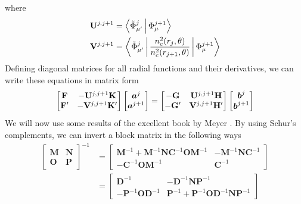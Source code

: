 where
	\begin{subequations} 
	\begin{align}
    	\mathbf{U}^{j,j+1}	&= \Braket{\tilde{\Phi}_{\mu'}^j|\Phi_\mu^{j+1}}	\\
    	\mathbf{V}^{j,j+1} &= \Braket{\tilde{\Phi}_{\mu'}^j|\frac{n^2_c(r_j,\theta)}{n^2_c(r_{j+1},\theta)}|\Phi_\mu^{j+1}}
  	\end{align}
  	\end{subequations}
Defining diagonal matrices for all radial functions
and their derivatives, we can write these equations in matrix
form 
  \begin{equation}
    \label{eq:Smatrix.boundaryCond}
    \begin{bmatrix}
      \mathbf{F} 	& -\mathbf{U}^{j,j+1}\mathbf{K}	\\
      \mathbf{F}'	& -\mathbf{V}^{j,j+1}\mathbf{K}'
    \end{bmatrix}
    \begin{bmatrix}
      \boldsymbol{a}^j	\\	\boldsymbol{a}^{j+1}
    \end{bmatrix}
     = 
     \begin{bmatrix}
      -\mathbf{G}	& \mathbf{U}^{j,j+1}\mathbf{H}	\\
      -\mathbf{G}'	& \mathbf{V}^{j,j+1}\mathbf{H}'
     \end{bmatrix}
         \begin{bmatrix}
      \boldsymbol{b}^j	\\	\boldsymbol{b}^{j+1}
    \end{bmatrix}
  \end{equation}
We will now use some results of the excellent book by Meyer \cite{MEY2001}.
By using Schur's complements, we can invert a block matrix in the following
ways
  \begin{align}
    \begin{bmatrix} \mathbf{M} & \mathbf{N} \\ \mathbf{O} & \mathbf{P} \end{bmatrix}^{-1}
     &= 
    \begin{bmatrix}
     \mathbf{M}^{-1}+\mathbf{M}^{-1}\mathbf{NC}^{-1}\mathbf{OM}^{-1}	& -\mathbf{M}^{-1}\mathbf{NC}^{-1}	\\
     -\mathbf{C}^{-1}\mathbf{OM}^{-1}					& \mathbf{C}^{-1}
    \end{bmatrix}						\\
     &=
      \begin{bmatrix}
       \mathbf{D}^{-1}				& -\mathbf{D}^{-1}\mathbf{NP}^{-1}	\\
       -\mathbf{P}^{-1}\mathbf{OD}^{-1}		& \mathbf{P}^{-1}+\mathbf{P}^{-1}\mathbf{OD}^{-1}\mathbf{NP}^{-1}
      \end{bmatrix}
  \end{align}
